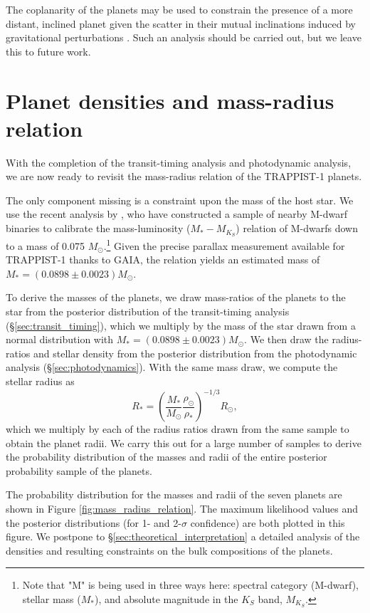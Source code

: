 \documentclass[twocolumn]{aastex63}
\begin{document}
The coplanarity of the planets may be used to constrain the presence of a
more distant, inclined planet given the scatter in their mutual inclinations
induced by gravitational perturbations \citep{JontofHutter2018}.  Such an
analysis should be carried out, but we leave this to future work.

\section{Planet densities and mass-radius relation} \label{sec:mass_radius_relation}

With the completion of the transit-timing analysis and photodynamic analysis, we are now ready to revisit the mass-radius relation of the TRAPPIST-1 planets.  

The only component missing is a constraint upon the mass of the host star.  We use the recent analysis by \citet{Mann2019}, who have constructed a sample of nearby M-dwarf binaries to calibrate the mass-luminosity ($M_*-M_{K_S}$) relation of M-dwarfs down to a mass of 0.075 $M_\odot$.\footnote{Note that "M" is being used in three ways here: spectral category (M-dwarf), stellar mass ($M_*$), and
absolute magnitude in the $K_S$ band, $M_{K_S}$.}   Given the precise parallax measurement available for TRAPPIST-1 thanks to GAIA, the relation yields an estimated mass of $M_* = (0.0898\pm 0.0023) M_\odot$.

To derive the masses of the planets, we draw mass-ratios of the planets to the star from the posterior distribution of the transit-timing analysis (\S \ref{sec:transit_timing}), which we multiply by the mass of the star drawn from a normal distribution with $M_* = (0.0898\pm 0.0023) M_\odot$. We then draw the radius-ratios and stellar density from the posterior distribution from the photodynamic analysis (\S \ref{sec:photodynamics}).
With the same mass draw, we compute the stellar radius as
\begin{equation}
    R_* = \left(\frac{M_*}{M_\odot}\frac{\rho_\odot}{\rho_*}\right)^{-1/3} R_\odot,
\end{equation} 
which we multiply by each of the radius ratios drawn from the same sample to obtain the planet radii.   We carry this out for a large number of samples to derive the probability distribution of the masses and radii of the entire posterior probability sample of the planets.

The probability distribution for the masses and radii of the seven planets are shown in Figure \ref{fig:mass_radius_relation}.  The maximum likelihood values and the posterior distributions (for 1- and 2-$\sigma$ confidence) are both plotted in this figure.  We postpone to \S\ref{sec:theoretical_interpretation} a detailed analysis of the densities and resulting constraints on the bulk compositions of the planets.
\end{document}
